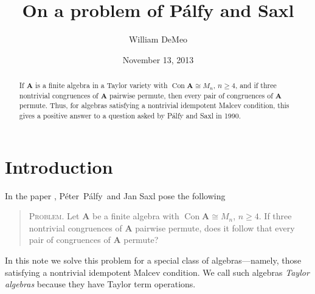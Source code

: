 \newcommand{\defn}[1]{{\it #1}}
\newcommand{\Peter}{P{\'e}ter}
\newcommand{\Palfy}{P\'alfy\xspace}
\newcommand{\bA}{\ensuremath{\mathbf{A}}}
\newcommand{\sP}{\ensuremath{\mathscr{P}}}
\newcommand{\sS}{\ensuremath{\mathcal{S}}}
\newcommand{\Con}{\ensuremath{\operatorname{Con}}}
\newcommand{\Eq}{\ensuremath{\operatorname{Eq}}}

\newcommand{\rel}{\ensuremath{\mathrel}}
\newcommand{\ralpha}{\ensuremath{\mathrel{\alpha}}}
\newcommand{\rbeta}{\ensuremath{\mathrel{\beta}}}
\newcommand{\rgamma}{\ensuremath{\mathrel{\gamma}}}
\newcommand{\rdelta}{\ensuremath{\mathrel{\tau}}}
\newcommand{\rrho}{\ensuremath{\mathrel{\tau}}}
\newcommand{\rtau}{\ensuremath{\mathrel{\tau}}}
\newcommand{\rtheta}{\ensuremath{\mathrel{\theta}}}

\newcommand{\meet}{\ensuremath{\wedge}}
\newcommand{\join}{\ensuremath{\vee}}
\newcommand{\Meet}{\ensuremath{\bigwedge}}
\renewcommand{\Join}{\ensuremath{\bigvee}}
\newcommand{\nb}[1]{\ensuremath{\operatorname{\boldsymbol{\nu}}(#1)}}




\title{On a problem of P\'{a}lfy and Saxl}
\author{William DeMeo}
\date{November 13, 2013}

\maketitle
\begin{abstract}
If $\bA$ is a finite algebra in a Taylor variety 
with $\Con \bA \cong M_n$, $n\geq 4$, and if three nontrivial congruences 
of $\bA$ pairwise permute, then every pair of congruences of $\bA$ permute.
Thus, for algebras satisfying a nontrivial idempotent Malcev
condition, this gives a positive answer to a question asked by \Palfy and
Saxl in 1990. 

\end{abstract}

\section{Introduction}
In the paper \cite{PalfySaxl}, \Peter\ \Palfy\ and Jan Saxl pose 
the following 
\begin{quote}
  {\scshape Problem.}
  Let $\bA$ be a finite algebra with $\Con \bA \cong M_n$, $n\geq
  4$. If three nontrivial congruences of $\bA$ pairwise permute, does it follow
  that every pair of congruences of $\bA$ permute?
\end{quote}
In this note we solve this problem for a special class of algebras---namely,
those satisfying a nontrivial idempotent Malcev condition.  We call such algebras
\defn{Taylor algebras} because they have Taylor term operations.

